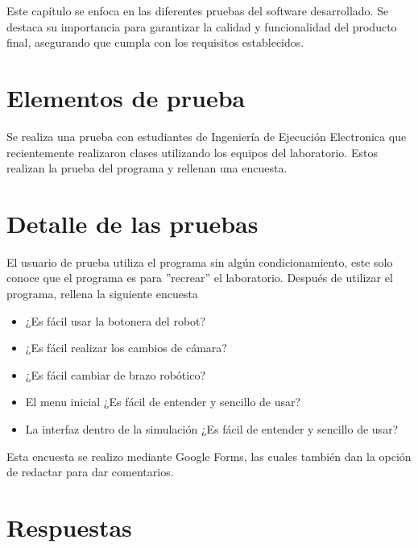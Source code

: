Este capítulo se enfoca en las diferentes pruebas del software desarrollado. Se destaca su importancia para garantizar la calidad y funcionalidad del producto final, asegurando que cumpla con los requisitos establecidos.
\section{Elementos de prueba}
Se realiza una prueba con estudiantes de Ingeniería de Ejecución Electronica que recientemente realizaron clases utilizando los equipos del laboratorio.
Estos realizan la prueba del programa y rellenan una encuesta.

\section{Detalle de las pruebas}
El usuario de prueba utiliza el programa sin algún condicionamiento, este solo conoce que el programa es para ''recrear'' el laboratorio.
Después de utilizar el programa, rellena la siguiente encuesta
\begin{itemize}
\item ¿Es fácil usar la botonera del robot?
\item ¿Es fácil realizar los cambios de cámara?
\item ¿Es fácil cambiar de brazo robótico?
\item El menu inicial ¿Es fácil de entender y sencillo de usar?
\item La interfaz dentro de la simulación ¿Es fácil de entender y sencillo de usar?
\end{itemize}

Esta encuesta se realizo mediante Google Forms, las cuales también dan la opción de redactar para dar comentarios.

\clearpage
\section{Respuestas}


